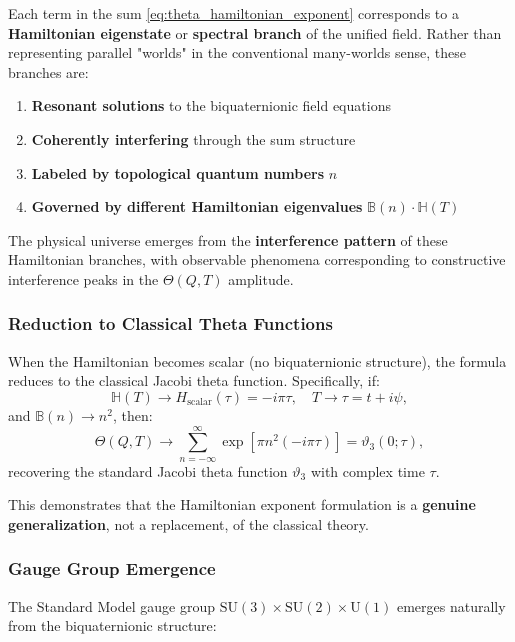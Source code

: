 Each term in the sum \eqref{eq:theta_hamiltonian_exponent} corresponds to a \textbf{Hamiltonian eigenstate} or \textbf{spectral branch} of the unified field. Rather than representing parallel "worlds" in the conventional many-worlds sense, these branches are:

\begin{enumerate}
\item \textbf{Resonant solutions} to the biquaternionic field equations
\item \textbf{Coherently interfering} through the sum structure
\item \textbf{Labeled by topological quantum numbers} $n$
\item \textbf{Governed by different Hamiltonian eigenvalues} $\mathbb{B}(n) \cdot \mathbb{H}(T)$
\end{enumerate}

The physical universe emerges from the \textbf{interference pattern} of these Hamiltonian branches, with observable phenomena corresponding to constructive interference peaks in the $\Theta(Q,T)$ amplitude.

\subsubsection{Reduction to Classical Theta Functions}

When the Hamiltonian becomes scalar (no biquaternionic structure), the formula reduces to the classical Jacobi theta function. Specifically, if:
\begin{equation}
\mathbb{H}(T) \to H_{\text{scalar}}(\tau) = -i\pi\tau, \quad T \to \tau = t + i\psi,
\end{equation}
and $\mathbb{B}(n) \to n^2$, then:
\begin{equation}
\Theta(Q, T) \to \sum_{n=-\infty}^{\infty} \exp\!\left[\pi n^2 (-i\pi\tau)\right] = \vartheta_3(0; \tau),
\label{eq:classical_limit}
\end{equation}
recovering the standard Jacobi theta function $\vartheta_3$ with complex time $\tau$.

This demonstrates that the Hamiltonian exponent formulation is a \textbf{genuine generalization}, not a replacement, of the classical theory.

\subsubsection{Gauge Group Emergence}

The Standard Model gauge group $\text{SU}(3) \times \text{SU}(2) \times \text{U}(1)$ emerges naturally from the biquaternionic structure:

